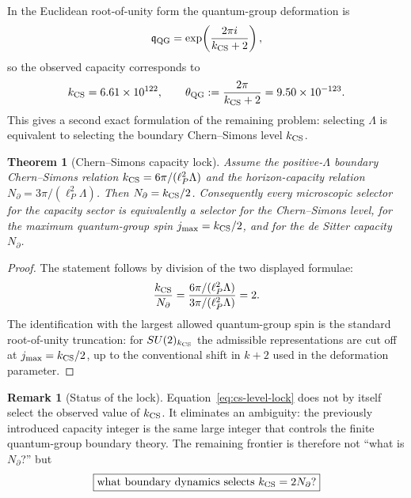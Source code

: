 \documentclass[aps,prd,reprint,nofootinbib,superscriptaddress,floatfix]{revtex4-2}
\numberwithin{equation}{section}
\theoremstyle{definition}
\newtheorem{remark}{Remark}[section]
\theoremstyle{plain}
\newtheorem{theorem}{Theorem}[section]
\begin{document}
In the Euclidean root-of-unity form the quantum-group deformation is
\begin{equation}
\mathfrak q_{\rm QG}
=
\exp\!\left(\frac{2\pi i}{k_{\rm CS}+2}\right),
\end{equation}
so the observed capacity corresponds to
\begin{equation}
k_{\rm CS}=6.61\times10^{122},
\qquad
\theta_{\rm QG}:=\frac{2\pi}{k_{\rm CS}+2}
=9.50\times10^{-123}.
\end{equation}
This gives a second exact formulation of the remaining problem:
selecting \(\Lambda\) is equivalent to selecting the boundary
Chern--Simons level \(k_{\rm CS}\).

\begin{theorem}[Chern--Simons capacity lock]
Assume the positive-\(\Lambda\) boundary Chern--Simons relation
\(k_{\rm CS}=6\pi/(\ell_P^2\Lambda)\) and the horizon-capacity relation
\(N_\partial=3\pi/(\ell_P^2\Lambda)\).  Then \(N_\partial=k_{\rm CS}/2\).
Consequently every microscopic selector for the capacity sector is
equivalently a selector for the Chern--Simons level, for the maximum
quantum-group spin \(j_{\max}=k_{\rm CS}/2\), and for the de Sitter
capacity \(N_\partial\).
\end{theorem}

\begin{proof}
The statement follows by division of the two displayed formulae:
\[
\frac{k_{\rm CS}}{N_\partial}
=
\frac{6\pi/(\ell_P^2\Lambda)}
     {3\pi/(\ell_P^2\Lambda)}
=2.
\]
The identification with the largest allowed quantum-group spin is the
standard root-of-unity truncation: for \(SU(2)_{k_{\rm CS}}\) the
admissible representations are cut off at \(j_{\max}=k_{\rm CS}/2\), up
to the conventional shift in \(k+2\) used in the deformation parameter.
\end{proof}

\begin{remark}[Status of the lock]
Equation~\eqref{eq:cs-level-lock} does not by itself select the
observed value of \(k_{\rm CS}\).  It eliminates an ambiguity: the
previously introduced capacity integer is the same large integer that
controls the finite quantum-group boundary theory.  The remaining
frontier is therefore not ``what is \(N_\partial\)?'' but
\[
\boxed{
\text{what boundary dynamics selects }k_{\rm CS}=2N_\partial?
}
\]
\end{remark}
\end{document}
